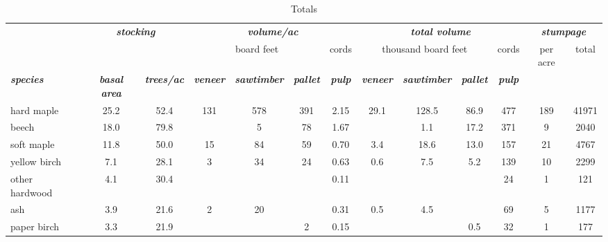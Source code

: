 \documentclass[landscape]{article}
\begin{document}
\begin{table}[H]

\caption{\label{tab:unnamed-chunk-9}Totals}
\fontsize{10}{12}\selectfont
\begin{tabular}[t]{lcccccccccccc}
\toprule
\multicolumn{1}{c}{\em{\textbf{ }}} & \multicolumn{2}{c}{\em{\textbf{stocking}}} & \multicolumn{4}{c}{\em{\textbf{volume/ac }}} & \multicolumn{4}{c}{\em{\textbf{total volume}}} & \multicolumn{2}{c}{\em{\textbf{stumpage}}} \\
\cmidrule(l{3pt}r{3pt}){2-3} \cmidrule(l{3pt}r{3pt}){4-7} \cmidrule(l{3pt}r{3pt}){8-11} \cmidrule(l{3pt}r{3pt}){12-13}
\multicolumn{3}{c}{ } & \multicolumn{3}{c}{board feet} & \multicolumn{1}{c}{cords} & \multicolumn{3}{c}{thousand board feet} & \multicolumn{1}{c}{cords} & \multicolumn{1}{c}{per acre} & \multicolumn{1}{c}{total} \\
\cmidrule(l{3pt}r{3pt}){4-6} \cmidrule(l{3pt}r{3pt}){7-7} \cmidrule(l{3pt}r{3pt}){8-10} \cmidrule(l{3pt}r{3pt}){11-11} \cmidrule(l{3pt}r{3pt}){12-12} \cmidrule(l{3pt}r{3pt}){13-13}
\rowcolor[HTML]{DCDCDC}  \em{\textbf{species}} & \em{\textbf{basal area}} & \em{\textbf{trees/ac}} & \em{\textbf{veneer}} & \em{\textbf{sawtimber}} & \em{\textbf{pallet}} & \em{\textbf{pulp}} & \em{\textbf{veneer}} & \em{\textbf{sawtimber}} & \em{\textbf{pallet}} & \em{\textbf{pulp}} & \em{\textbf{ }} & \em{\textbf{ }}\\
\midrule
\rowcolor{gray!6}  hard maple & 25.2 & 52.4 & 131 & 578 & 391 & 2.15 & 29.1 & 128.5 & 86.9 & 477 & 189 & 41971\\
 
beech & 18.0 & 79.8 &  & 5 & 78 & 1.67 &  & 1.1 & 17.2 & 371 & 9 & 2040\\
 
\rowcolor{gray!6}  soft maple & 11.8 & 50.0 & 15 & 84 & 59 & 0.70 & 3.4 & 18.6 & 13.0 & 157 & 21 & 4767\\
 
yellow birch & 7.1 & 28.1 & 3 & 34 & 24 & 0.63 & 0.6 & 7.5 & 5.2 & 139 & 10 & 2299\\
 
\rowcolor{gray!6}  other hardwood & 4.1 & 30.4 &  &  &  & 0.11 &  &  &  & 24 & 1 & 121\\
 
ash & 3.9 & 21.6 & 2 & 20 &  & 0.31 & 0.5 & 4.5 &  & 69 & 5 & 1177\\
 
\rowcolor{gray!6}  paper birch & 3.3 & 21.9 &  &  & 2 & 0.15 &  &  & 0.5 & 32 & 1 & 177\\
 

\end{tabular}
\end{table}
\end{document}
